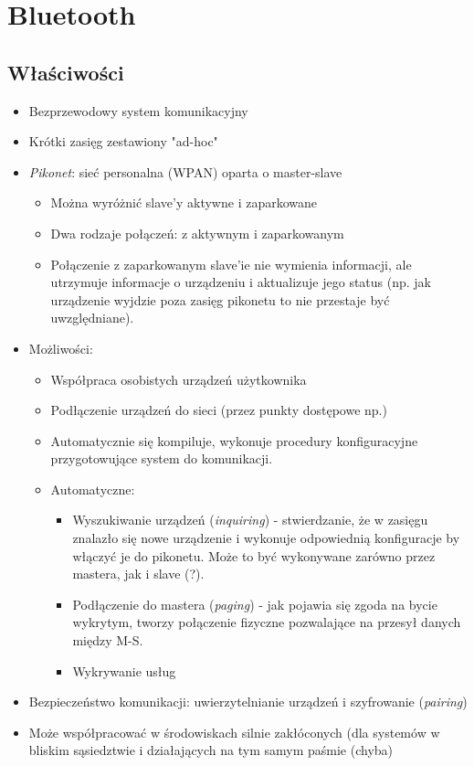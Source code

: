 \newpage
\section{Bluetooth}
\subsection{Właściwości}
\begin{itemize}
	\item Bezprzewodowy system komunikacyjny
	\item Krótki zasięg zestawiony "ad-hoc"
	\item \textit{Pikonet}: sieć personalna (WPAN) oparta o master-slave
	\begin{itemize}
		\item Można wyróżnić slave'y aktywne i zaparkowane
		\item Dwa rodzaje połączeń: z aktywnym i zaparkowanym
		\item Połączenie z zaparkowanym slave'ie nie wymienia informacji, ale utrzymuje informacje o urządzeniu i aktualizuje jego status (np. jak urządzenie wyjdzie poza zasięg pikonetu to nie przestaje być uwzględniane).
	\end{itemize}
	\item Możliwości:
	\begin{itemize}
		\item Współpraca osobistych urządzeń użytkownika
		\item Podłączenie urządzeń do sieci (przez punkty dostępowe np.)
		\item Automatycznie się kompiluje, wykonuje procedury konfiguracyjne przygotowujące system do komunikacji.
		\item Automatyczne:
		\begin{itemize}
			\item Wyszukiwanie urządzeń (\emph{inquiring}) - stwierdzanie, że w zasięgu znalazło się nowe urządzenie i wykonuje odpowiednią konfiguracje by włączyć je do pikonetu. Może to być wykonywane zarówno przez mastera, jak i slave (?).
			\item Podłączenie do mastera (\emph{paging}) - jak pojawia się zgoda na bycie wykrytym, tworzy połączenie fizyczne pozwalające na przesył danych między M-S.
			\item Wykrywanie usług
		\end{itemize}
	\end{itemize}
	\item Bezpieczeństwo komunikacji: uwierzytelnianie urządzeń i szyfrowanie (\emph{pairing})
	\item Może współpracować w środowiskach silnie zakłóconych (dla systemów w bliskim sąsiedztwie i działających na tym samym paśmie (chyba)	
\end{itemize}
